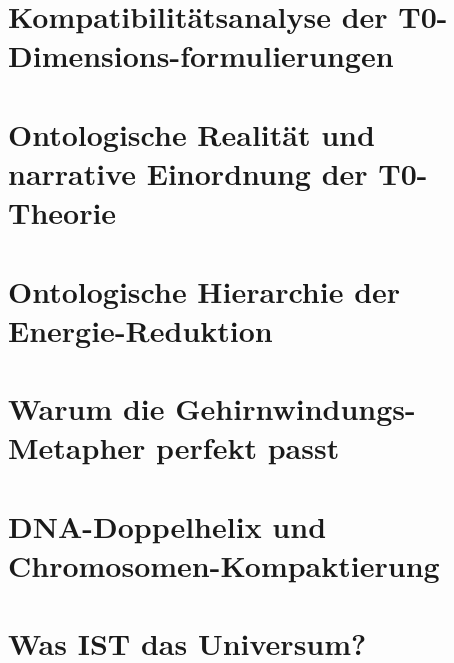 	\chapter{Kompatibilitätsanalyse der T0-Dimensions-formulierungen}
	
	\chapter{Ontologische Realität und narrative Einordnung der T0-Theorie}
	
	\chapter{Ontologische Hierarchie der Energie-Reduktion}
	
	\chapter{Warum die Gehirnwindungs-Metapher perfekt passt}
	
	\chapter{DNA-Doppelhelix und Chromosomen-Kompaktierung}
	
	\chapter{Was IST das Universum?}
	
	


